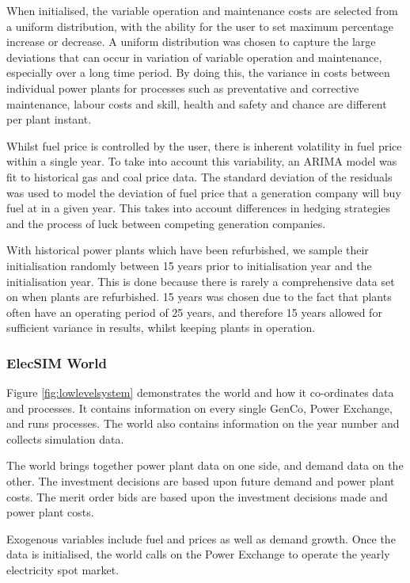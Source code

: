 When initialised, the variable operation and maintenance costs are selected from a uniform distribution, with the ability for the user to set maximum percentage increase or decrease. A uniform distribution was chosen to capture the large deviations that can occur in variation of variable operation and maintenance, especially over a long time period. By doing this, the variance in costs between individual power plants for processes such as preventative and corrective maintenance, labour costs and skill, health and safety and chance are different per plant instant.  

Whilst fuel price is controlled by the user, there is inherent volatility in fuel price within a single year. To take into account this variability, an ARIMA model was fit to historical gas and coal price data. The standard deviation of the residuals was used to model the deviation of fuel price that a generation company will buy fuel at in a given year. This takes into account differences in hedging strategies and the process of luck between competing generation companies.

With historical power plants which have been refurbished, we sample their initialisation randomly between 15 years prior to initialisation year and the initialisation year. This is done because there is rarely a comprehensive data set on when plants are refurbished. 15 years was chosen due to the fact that plants often have an operating period of 25 years, and therefore 15 years allowed for sufficient variance in results, whilst keeping plants in operation.

\subsubsection{ElecSIM World}

Figure \ref{fig:lowlevelsystem} demonstrates the world and how it co-ordinates data and processes. It contains information on every single GenCo, Power Exchange, and runs processes. The world also contains information on the year number and collects simulation data.

The world brings together power plant data on one side, and demand data on the other. The investment decisions are based upon future demand and power plant costs. The merit order bids are based upon the investment decisions made and power plant costs.

Exogenous variables include fuel and  prices as well as demand growth. Once the data is initialised, the world calls on the Power Exchange to operate the yearly electricity spot market.

